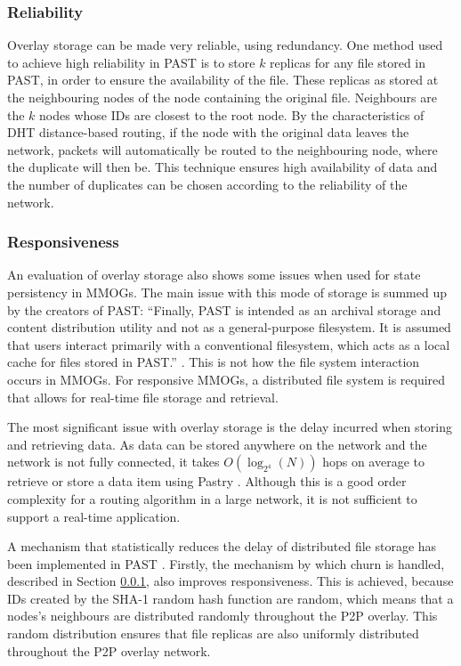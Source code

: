 \documentclass[10pt,a4paper,journal,cspaper,compsoc]{IEEEtran}
\begin{document}
\subsubsection{Reliability}
\label{overlay_storage_reliability}

Overlay storage can be made very reliable, using redundancy. One method used to achieve high reliability in PAST is to store $k$ replicas for any
file stored in PAST, in order to ensure the availability of the file. These replicas as stored at the neighbouring nodes of the node containing the
original file. Neighbours are the $k$ nodes whose IDs are closest to the root node. By the characteristics of DHT distance-based routing, if the node
with the original data leaves the network, packets will automatically be routed to the neighbouring node, where the duplicate will then be. This
technique ensures high availability of data and the number of duplicates can be chosen according to the reliability of the network.


\subsubsection{Responsiveness}
An evaluation of overlay storage also shows some issues when used for state persistency in MMOGs. The main issue with this mode of storage is summed
up by the creators of PAST: ``Finally, PAST is intended as an archival storage and content distribution utility and not as a general-purpose
filesystem. It is assumed that users interact primarily with a conventional filesystem, which acts as a local cache for files stored in PAST.''
\cite{storage_and_chaching_PAST}. This is not how the file system interaction occurs in MMOGs. For responsive MMOGs, a distributed file system is
required that allows for real-time file storage and retrieval.

The most significant issue with overlay storage is the delay incurred when storing and retrieving data. As data can be stored anywhere on the network
and the network is not fully connected, it takes $O(\log_{2^4}(N))$ hops on average to retrieve or store a data item using Pastry
\cite{storage_and_chaching_PAST}. Although this is a good order complexity for a routing algorithm in a large network, it is not sufficient to
support a real-time application.

A mechanism that statistically reduces the delay of distributed file storage has been implemented in PAST \cite{storage_and_chaching_PAST}. Firstly,
the mechanism by which churn is handled, described in Section \ref{overlay_storage_reliability}, also improves responsiveness.  This is achieved,
because IDs created by the SHA-1 random hash function are random, which means that a nodes's neighbours are distributed randomly throughout the P2P
overlay. This random distribution ensures that file replicas are also uniformly distributed throughout the P2P overlay network.
\end{document}
